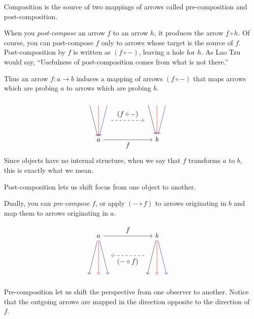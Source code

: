 \documentclass[DaoFP]{subfiles}
\begin{document}
Composition is the source of two mappings of arrows called pre-composition and post-composition. 

When you \emph{post-compose} an arrow $f$ to an arrow $h$, it produces the arrow $f \circ h$. Of course, you can post-compose $f$ only to arrows whose target is the source of $f$. Post-composition by $f$ is written as $(f \circ -)$, leaving a hole for $h$. As Lao Tzu would say, ``Usefulness of post-composition comes from what is not there.''

Thus an arrow $f \colon a \to b$ induces a mapping of arrows $(f \circ -)$ that maps arrows which are probing $a$ to arrows which are probing $b$. 

\[
 \begin{tikzcd}
 \node (a1) at (0, 2) {};
 \node (a2) at (-0.5, 2) {};
 \node (a3) at (0.5, 2) {};
 \node (aa) at (0.5, 1) {};
 \node(a) at (0, 0) {a};
 \draw[->, red] (a1) -- (a);
 \draw[->] (a2) -- (a);
 \draw[->, blue] (a3) -- (a);
 \node (b1) at (3+0, 2) {};
 \node (b2) at (3-0.5, 2) {};
 \node (b3) at (3+0.5, 2) {};
 \node (bb) at (2.5, 1) {};
 \node(b) at (3, 0) {b};
 \draw[->, red] (b1) -- (b);
 \draw[->] (b2) -- (b);
 \draw[->, blue] (b3) -- (b);
 \draw[->] (a) -- node[below]{f} (b);
 \draw[->, dashed] (aa) -- node[above]{(f \circ -)} (bb);
  \end{tikzcd}
\]
Since objects have no internal structure, when we say that $f$ transforms $a$ to $b$, this is exactly what we mean. 

Post-composition lets us shift focus from one object to another.

Dually, you can \emph{pre-compose} $f$, or apply $(- \circ f)$ to arrows originating in $b$ and map them to arrows originating in $a$. 

\[
 \begin{tikzcd}
 \node (a1) at (0, -2) {};
 \node (a2) at (-0.5, -2) {};
 \node (a3) at (0.5, -2) {};
 \node (aa) at (0.5, -1) {};
 \node(a) at (0, 0) {a};
 \draw[<-, red] (a1) -- (a);
 \draw[<-] (a2) -- (a);
 \draw[<-, blue] (a3) -- (a);
 \node (b1) at (3+0, -2) {};
 \node (b2) at (3-0.5, -2) {};
 \node (b3) at (3+0.5, -2) {};
 \node (bb) at (2.5, -1) {};
 \node(b) at (3, 0) {b};
 \draw[<-, red] (b1) -- (b);
 \draw[<-] (b2) -- (b);
 \draw[<-, blue] (b3) -- (b);
 \draw[->] (a) -- node[above]{f} (b);
 \draw[->, dashed] (bb) -- node[below]{(- \circ f)} (aa);
  \end{tikzcd}
\]

Pre-composition let us shift the perspective from one observer to another. Notice that the outgoing arrows are mapped in the direction opposite to the direction of $f$.
\end{document}
